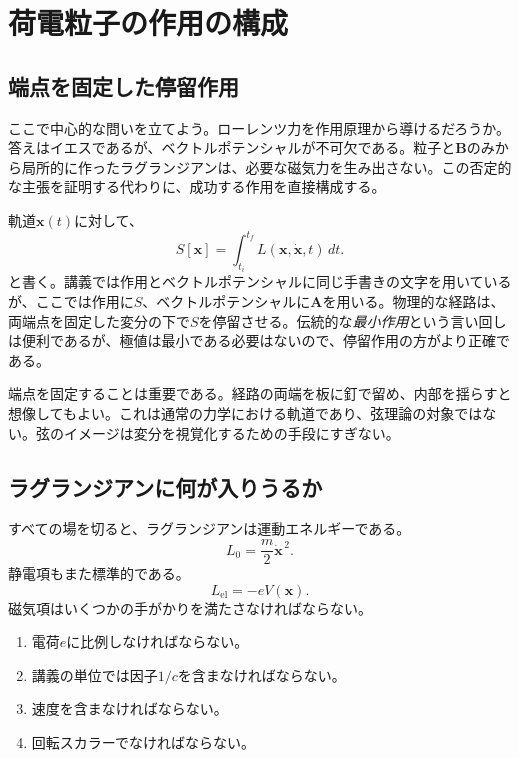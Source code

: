 \section{荷電粒子の作用の構成}

\subsection{端点を固定した停留作用}

ここで中心的な問いを立てよう。ローレンツ力を作用原理から導けるだろうか。答えはイエスであるが、ベクトルポテンシャルが不可欠である。粒子と\(\mathbf B\)のみから局所的に作ったラグランジアンは、必要な磁気力を生み出さない。この否定的な主張を証明する代わりに、成功する作用を直接構成する。

軌道\(\mathbf x(t)\)に対して、
\begin{equation}
  S[\mathbf x]
  =
  \int_{t_i}^{t_f}L(\mathbf x,\dot{\mathbf x},t)\,dt.
\end{equation}
と書く。講義では作用とベクトルポテンシャルに同じ手書きの文字を用いているが、ここでは作用に\(S\)、ベクトルポテンシャルに\(\mathbf A\)を用いる。物理的な経路は、両端点を固定した変分の下で\(S\)を停留させる。伝統的な\emph{最小作用}という言い回しは便利であるが、極値は最小である必要はないので、停留作用の方がより正確である。

端点を固定することは重要である。経路の両端を板に釘で留め、内部を揺らすと想像してもよい。これは通常の力学における軌道であり、弦理論の対象ではない。弦のイメージは変分を視覚化するための手段にすぎない。

\subsection{ラグランジアンに何が入りうるか}

すべての場を切ると、ラグランジアンは運動エネルギーである。
\begin{equation}
  L_0=\frac{m}{2}\dot{\mathbf x}^{\,2}.
\end{equation}
静電項もまた標準的である。
\begin{equation}
  L_{\mathrm{el}}=-eV(\mathbf x).
\end{equation}
磁気項はいくつかの手がかりを満たさなければならない。
\begin{enumerate}
  \item 電荷\(e\)に比例しなければならない。
  \item 講義の単位では因子\(1/c\)を含まなければならない。
  \item 速度を含まなければならない。
  \item 回転スカラーでなければならない。
\end{enumerate}

